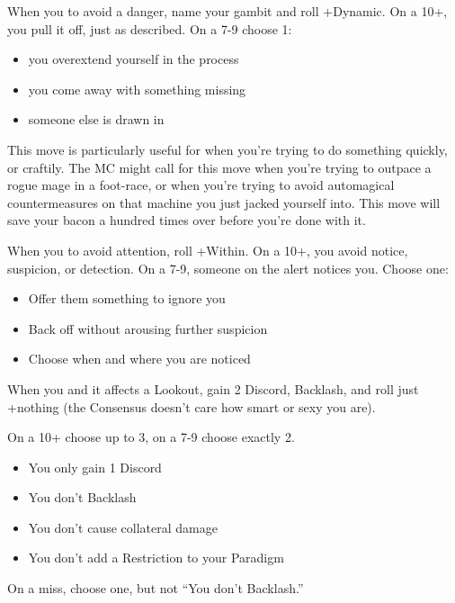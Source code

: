 \begin{multicols}{3}
  \begin{move}
    When you  to avoid a
    danger, name your gambit and roll +Dynamic. On a 10+, you pull it
    off, just as described. On a 7-9 choose 1:
    \begin{itemize}
      \setlength\itemsep{0em}
      \item you overextend yourself in the process
      \item you come away with something missing
      \item someone else is drawn in
    \end{itemize}
\begin{movedetail}
  This move is particularly useful for when you're trying to do
  something quickly, or craftily. The MC might call for this move when
  you're trying to outpace a rogue mage in a foot-race, or when you're
  trying to avoid automagical countermeasures on that machine you just
  jacked yourself into. This move will save your bacon a hundred times
  over before you're done with it.
\end{movedetail}
  \end{move}

  \SEPARATOR

  \begin{move}
    When you  to avoid attention, roll
    +Within. On a 10+, you avoid notice, suspicion, or detection. On a
    7-9, someone on the alert notices you. Choose one:
    \begin{itemize}
      \setlength\itemsep{0em}
    \item Offer them something to ignore you
    \item Back off without arousing further suspicion
    \item Choose when and where you are noticed
    \end{itemize}
  \end{move}

  \SEPARATOR

  \begin{move}
    When you  and it affects a Lookout, gain
    2 Discord, Backlash, and roll just +nothing (the Consensus doesn't
    care how smart or sexy you are).

    On a 10+ choose up to 3, on a 7-9 choose exactly 2.
    \begin{itemize}
      \setlength\itemsep{0em}
    \item You only gain 1 Discord
    \item You don't Backlash
    \item You don't cause collateral damage
    \item You don't add a Restriction to your Paradigm
    \end{itemize}
    On a miss, choose one, but not ``You don't Backlash.''
  \end{move}


\end{multicols}
